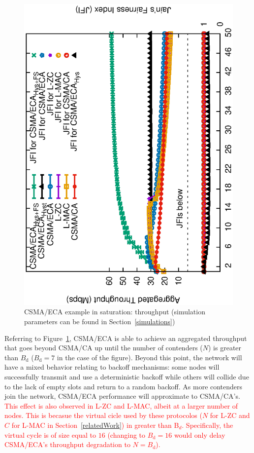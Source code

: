 \begin{figure}[tb]
\centering
  \includegraphics[width=0.7\linewidth, angle=-90]{figures/tonFigs/DCF-v-ECA-TON.eps}
  \caption{CSMA/ECA example in saturation: throughput (simulation parameters can be found in Section~\ref{simulations})}
  \label{fig:BECA}
\end{figure}

Referring to Figure~\ref{fig:BECA}, CSMA/ECA is able to achieve an aggregated throughput that goes beyond CSMA/CA up until the number of contenders ($N$) is greater than $B_{\text{d}}$ ($B_{\text{d}}=7$ in the case of the figure). Beyond this point, the network will have a mixed behavior relating to backoff mechanisms: some nodes will successfully transmit and use a deterministic backoff while others will collide due to the lack of empty slots and return to a random backoff. As more contenders join the network, CSMA/ECA performance will approximate to CSMA/CA's. \textcolor{red}{This effect is also observed in L-ZC and L-MAC, albeit at a larger number of nodes. This is becasue the virtual cicle used by these protocolos ($N$ for L-ZC and $C$ for L-MAC in Section~\ref{relatedWork}) in greater than B$_{d}$. Specifically, the virtual cycle is of size equal to $16$ (changing to $B_{\text{d}}=16$ would only delay CSMA/ECA's throughput degradation to $N=B_{\text{d}}$).}

